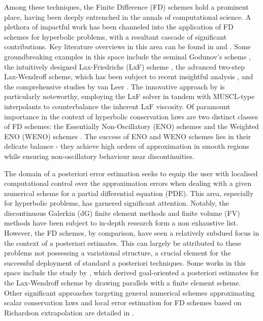 \documentclass[final]{amsart}
\numberwithin{equation}{section}
\begin{document}
Among these techniques, the Finite Difference (FD) schemes hold a
prominent place, having been deeply entrenched in the annals of
computational science. A plethora of impactful work has been channeled
into the application of FD schemes for hyperbolic problems, with a
resultant cascade of significant contributions. Key literature
overviews in this area can be found in \cite{leveque1992numerical} and
\cite{johnson1997advanced}. Some groundbreaking examples in this space
include the seminal Godunov's scheme \cite{godunov1959difference}, the
intuitively designed Lax-Friedrichs (LxF) scheme \cite{lax1954weak},
the advanced two-step Lax-Wendroff scheme, which has been subject to
recent insightful analysis \cite{liska2021lax}, and the comprehensive
studies by van Leer \cite{van1973towards, van1974towards,
  van1977towards, van1977towardsIV, van1979towards}. The innovative
approach by \cite{nessyahu1990non} is particularly noteworthy,
employing the LxF solver in tandem with MUSCL-type interpolants to
counterbalance the inherent LxF viscosity. Of paramount importance in
the context of hyperbolic conservation laws are two distinct classes
of FD schemes: the Essentially Non-Oscillatory (ENO) schemes
\cite{harten1987uniformly, shu1988efficient, shu1989efficient} and the
Weighted ENO (WENO) schemes \cite{liu1994weighted, jiang1996efficient,
  jiang1998nonoscillatory}. The success of ENO and WENO schemes
lies in their delicate balance - they achieve high orders of
approximation in smooth regions while ensuring non-oscillatory
behaviour near discontinuities.

The domain of a posteriori error estimation seeks to equip the user
with localised computational control over the approximation errors
when dealing with a given numerical scheme for a partial differential
equation (PDE). This area, especially for hyperbolic problems, has
garnered significant attention. Notably, the discontinuous Galerkin
(dG) finite element methods and finite volume (FV) methods have been
subject to in-depth research
\cite{johnson1990adaptive,johnson1995adaptive,dedner2007error,giesselmann2015posteriori,giesselmann2017posteriori,dedner2019residual,ainsworth2011posteriori,verfurth2013posteriori,cockburn1994error,chen2014goal,barth2018finite,semplice2016adaptive,semplice2018adaptive}
form a non exhaustive list. However, the FD schemes, by comparison,
have seen a relatively subdued focus in the context of a posteriori
estimates. This can largely be attributed to these problems not
possessing a variational structure, a crucial element for the
successful deployment of standard a posteriori techniques. Some works
in this space include the study by \cite{collins2014posteriori}, which
derived goal-oriented a posteriori estimates for the Lax-Wendroff
scheme by drawing parallels with a finite element scheme. Other
significant approaches targeting general numerical schemes
approximating scalar conservation laws and local error estimation for
FD schemes based on Richardson extrapolation are detailed in
\cite{cockburn1995posteriori, berger1984adaptive,
  arney1988posteriori}.
\end{document}
